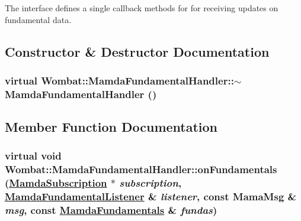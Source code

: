 The interface defines a single callback methods for for receiving updates on fundamental data. 



\subsection{Constructor \& Destructor Documentation}
\hypertarget{classWombat_1_1MamdaFundamentalHandler_a22288a7d092f7455206df07d7a08724}{
\subsubsection[$\sim$MamdaFundamentalHandler]{\setlength{\rightskip}{0pt plus 5cm}virtual Wombat::Mamda\-Fundamental\-Handler::$\sim$Mamda\-Fundamental\-Handler ()}}
\label{classWombat_1_1MamdaFundamentalHandler_a22288a7d092f7455206df07d7a08724}




\subsection{Member Function Documentation}
\hypertarget{classWombat_1_1MamdaFundamentalHandler_bfa96c33f4391803876657b78a1a2c82}{
\subsubsection[onFundamentals]{\setlength{\rightskip}{0pt plus 5cm}virtual void Wombat::Mamda\-Fundamental\-Handler::on\-Fundamentals (\hyperlink{classWombat_1_1MamdaSubscription}{Mamda\-Subscription} $\ast$ {\em subscription}, \hyperlink{classWombat_1_1MamdaFundamentalListener}{Mamda\-Fundamental\-Listener} \& {\em listener}, const Mama\-Msg \& {\em msg}, const \hyperlink{classWombat_1_1MamdaFundamentals}{Mamda\-Fundamentals} \& {\em fundas})}}
\label{classWombat_1_1MamdaFundamentalHandler_bfa96c33f4391803876657b78a1a2c82}


